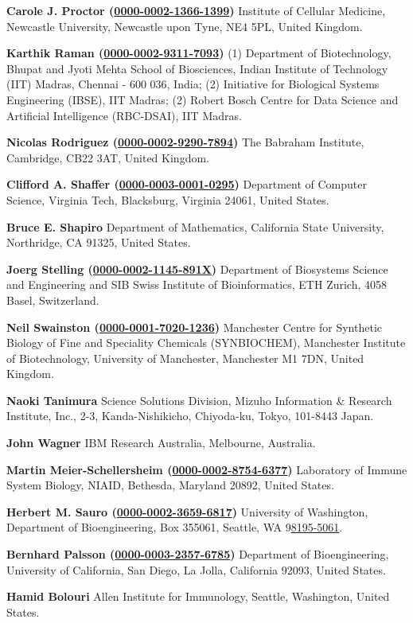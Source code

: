 \documentclass{sbml-paper}
\newcommand{\orcid}[1]{\href{https://orcid.org/#1}{#1}}
\begin{document}
\textbf{Carole J. Proctor (\orcid{0000-0002-1366-1399})} Institute of Cellular Medicine, Newcastle University, Newcastle upon Tyne, NE4 5PL, United Kingdom.

\textbf{Karthik Raman (\orcid{0000-0002-9311-7093})} (1) Department of Biotechnology, Bhupat and Jyoti Mehta School of Biosciences, Indian Institute of Technology (IIT) Madras, Chennai - 600 036, India; (2) Initiative for Biological Systems Engineering (IBSE), IIT Madras; (2) Robert Bosch Centre for Data Science and Artificial Intelligence (RBC-DSAI), IIT Madras.

\textbf{Nicolas Rodriguez (\orcid{0000-0002-9290-7894})} The Babraham Institute, Cambridge, CB22 3AT, United Kingdom.

\textbf{Clifford A. Shaffer (\orcid{0000-0003-0001-0295})} Department of Computer Science, Virginia Tech, Blacksburg, Virginia 24061, United States.

\textbf{Bruce E. Shapiro} Department of Mathematics, California State University, Northridge, CA 91325, United States.

\textbf{Joerg Stelling (\orcid{0000-0002-1145-891X})} Department of Biosystems Science and Engineering and SIB Swiss Institute of Bioinformatics, ETH Zurich, 4058 Basel, Switzerland.

\textbf{Neil Swainston (\orcid{0000-0001-7020-1236})} Manchester Centre for Synthetic Biology of Fine and Speciality Chemicals (SYNBIOCHEM), Manchester Institute of Biotechnology, University of Manchester, Manchester M1 7DN, United Kingdom.

\textbf{Naoki Tanimura} Science Solutions Division, Mizuho Information \& Research Institute, Inc., 2-3, Kanda-Nishikicho, Chiyoda-ku, Tokyo, 101-8443 Japan.

\textbf{John Wagner} IBM Research Australia, Melbourne, Australia.

\textbf{Martin Meier-Schellersheim (\orcid{0000-0002-8754-6377})} Laboratory of Immune System Biology, NIAID, Bethesda, Maryland 20892, United States.

\textbf{Herbert M. Sauro (\orcid{0000-0002-3659-6817})} University of Washington, Department of Bioengineering, Box 355061, Seattle, WA 9\orcid{8195-5061}.

\textbf{Bernhard Palsson (\orcid{0000-0003-2357-6785})} Department of Bioengineering, University of California, San Diego, La Jolla, California 92093, United States.

\textbf{Hamid Bolouri} Allen Institute for Immunology, Seattle, Washington, United States.
\end{document}
